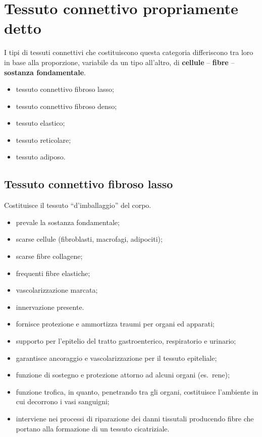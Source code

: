 \section{Tessuto connettivo propriamente detto}

I tipi di tessuti connettivi che costituiscono questa categoria differiscono tra loro in base alla proporzione, variabile da un tipo all'altro, di \textbf{cellule} -- \textbf{fibre} -- \textbf{sostanza fondamentale}.

\begin{itemize}
  \item tessuto connettivo fibroso lasso;
  \item tessuto connettivo fibroso denso;
  \item tessuto elastico;
  \item tessuto reticolare;
  \item tessuto adiposo.
\end{itemize}

\subsection{Tessuto connettivo fibroso lasso}

Costituisce il tessuto ``d'imballaggio'' del corpo.
\begin{itemize}
  \item prevale la sostanza fondamentale;
  \item scarse cellule (fibroblasti, macrofagi, adipociti);
  \item scarse fibre collagene;
  \item frequenti fibre elastiche;
  \item vascolarizzazione marcata;
  \item innervazione presente.
\end{itemize}

\begin{itemize}
  \item fornisce protezione e ammortizza traumi per organi ed apparati;
  \item supporto per l'epitelio del tratto gastroenterico, respiratorio e urinario;
  \item garantisce ancoraggio e vascolarizzazione per il tessuto epiteliale;
  \item funzione di sostegno e protezione attorno ad alcuni organi (es.\ rene);
  \item funzione trofica, in quanto, penetrando tra gli organi, costituisce l'ambiente in cui decorrono i vasi sanguigni;
  \item interviene nei processi di riparazione dei danni tissutali producendo fibre che portano alla formazione di un tessuto cicatriziale.
\end{itemize}

